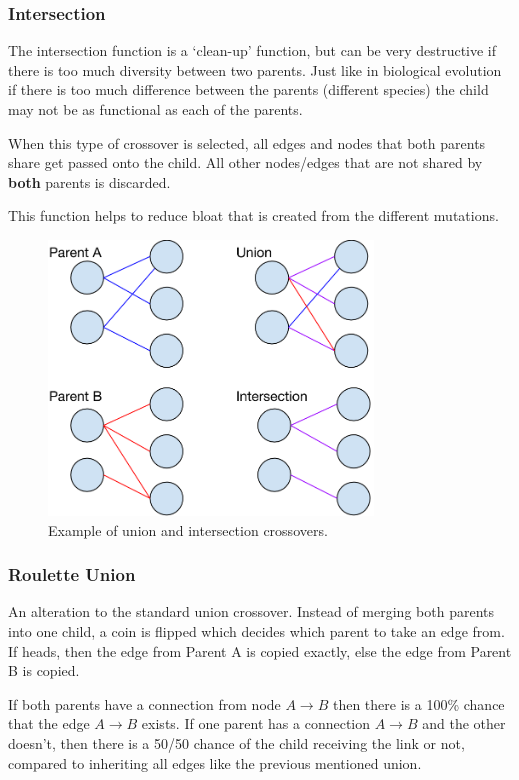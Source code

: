 \documentclass[journal]{IEEEtran}
\begin{document}
    \subsubsection{Intersection}
    The intersection function is a `clean-up' function, but can be very destructive if there
    is too much diversity between two parents. Just like in biological evolution if there is
    too much difference between the parents (different species) the child may not be as functional
    as each of the parents.

    When this type of crossover is selected, all edges and nodes that both parents share get
    passed onto the child. All other nodes/edges that are not shared by \textbf{both} parents
    is discarded.  \cite{lachlan}

    This function helps to reduce bloat that is created from the different mutations.

    \begin{figure}[!here]%
      \centering
      \includegraphics[width=3.4in]{ga_union_intersect}
      \caption{Example of union and intersection crossovers.}
      \label{fig:ga_union_intersect}
    \end{figure}

    \subsubsection{Roulette Union}
    An alteration to the standard union crossover. Instead of merging both parents into
    one child, a coin is flipped which decides which parent to take an edge from. If heads, then
    the edge from Parent A is copied exactly, else the edge from Parent B is copied.

    If both parents have a connection from node $ A \rightarrow B $ then there is a 100\% chance
    that the edge $A \rightarrow B$ exists. If one parent has a connection $A \rightarrow B$ and
    the other doesn't, then there is a 50/50 chance of the child receiving the link or not,
    compared to inheriting all edges like the previous mentioned union.
\end{document}
